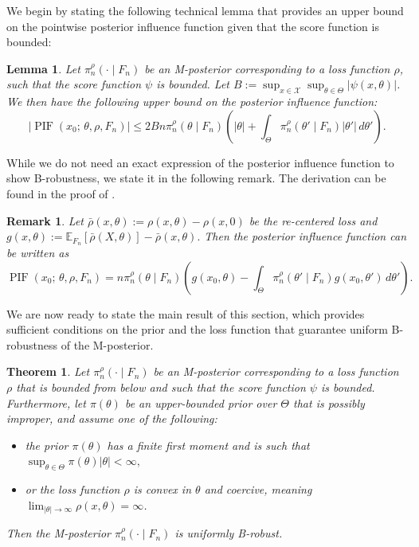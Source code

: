 \documentclass[11pt, oneside]{amsart}
\newtheorem{theorem}{Theorem}[]
\newtheorem{lemma}{Lemma}
\newtheorem{remark}{Remark}
\theoremstyle{definition}   %
\newcommand{\E}{\mathbb{E}}
\newcommand{\PIF}{\operatorname{PIF}}
\newcommand{\loss}{\rho}
\newcommand{\score}{\psi}
\newcommand{\closs}{\bar{\loss}}
\newcommand{\mposterior}{\pi_n^{\loss}}
\begin{document}
%
We begin by stating the following technical lemma that provides an upper bound on the pointwise posterior influence function given that the score function is bounded:
%
\begin{lemma}
\label{lemma::upper-bound-on-PIF}
    Let \( \mposterior (\cdot \mid F_n) \) be an M-posterior corresponding to a loss function \(\loss\), such that the score function \( \score \) is bounded. 
    Let \( B := \sup_{x \in \mathcal{X}} \sup_{\theta \in \Theta} \left | \score(x,\theta) \right | \). 
    We then have the following upper bound on the posterior influence function:
    \[
        |\PIF(x_0; \,\theta, \rho, F_n)|
        \leq 2B n \mposterior(\theta \mid F_n) \left ( | \theta | + \int_\Theta \mposterior(\theta' \mid F_n) |\theta'| \, d\theta' \right ).
    \]
\end{lemma}
%
While we do not need an exact expression of the posterior influence function to show B-robustness, we state it in the following remark. The derivation can be found in the proof of . 
%
\begin{remark}
    Let \( \closs ( x, \theta) := \loss(x, \theta) - \loss(x, 0)\) be the re-centered loss and
    \(
        g(x,\theta) := \E_{F_n} [ \closs(X, \theta) ] - \closs(x, \theta).
    \)
    Then the posterior influence function can be written as
    \begin{equation}
    \label{eqn::exact-PIF}
        \PIF(x_0; \,\theta, \rho, F_n) = n \mposterior(\theta \mid F_n) \left ( g(x_0, \theta) - \int_\Theta \mposterior(\theta' \mid F_n) g(x_0, \theta') \, d\theta' \right ).
    \end{equation}
\end{remark}
%
We are now ready to state the main result of this section, which provides sufficient conditions on the prior and the loss function that guarantee uniform B-robustness of the M-posterior.
%
%
\begin{theorem}
\label{thm::global-bias-robust}
    Let \( \mposterior (\cdot \mid F_n) \) be an M-posterior corresponding to a loss function \(\loss\) that is bounded from below and such that the score function \( \score\) is bounded. 
    Furthermore, let \( \pi(\theta) \) be an upper-bounded prior over \( \Theta \) that is possibly improper, and assume one of the following:
    \begin{itemize}
        \item the prior \( \pi(\theta) \) has a finite first moment and is such that \( \sup_{\theta \in \Theta} \pi(\theta) | \theta | < \infty, \)
        \item or the loss function \(\loss\) is convex in \( \theta \) and coercive, meaning \( \lim_{| \theta |\rightarrow \infty} \rho(x, \theta) = \infty \).
    \end{itemize}
    Then the M-posterior \( \mposterior(\cdot \mid F_n) \) is uniformly B-robust.
\end{theorem}
\end{document}
